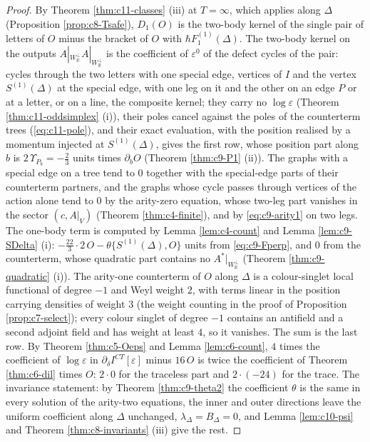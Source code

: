 \begin{proof}
By Theorem \ref{thm:c11-classes} (iii) at $T=\infty$, which applies along $\Delta$ (Proposition \ref{prop:c8-Tsafe}), $D_1(O)$ is the two-body kernel of the single pair of letters of $O$ minus the bracket of $O$ with $\hbar F_1^{(1)}(\Delta)$. The two-body kernel on the outputs $A|_{W_{\mathbb R}^\perp}A|_{W_{\mathbb R}^\perp}$ is the coefficient of $\varepsilon^0$ of the defect cycles of the pair: cycles through the two letters with one special edge, vertices of $I$ and the vertex $S^{(1)}(\Delta)$ at the special edge, with one leg on it and the other on an edge $P$ or at a letter, or on a line, the composite kernel; they carry no $\log\varepsilon$ (Theorem \ref{thm:c11-oddsimplex} (i)), their poles cancel against the poles of the counterterm trees (\eqref{eq:c11-pole}), and their exact evaluation, with the position realised by a momentum injected at $S^{(1)}(\Delta)$, gives the first row, whose position part along $b$ is $2\,\Upsilon_{P_b}=-\tfrac23$ units times $\partial_bO$ (Theorem \ref{thm:c9-P1} (ii)). The graphs with a special edge on a tree tend to $0$ together with the special-edge parts of their counterterm partners, and the graphs whose cycle passes through vertices of the action alone tend to $0$ by the arity-zero equation, whose two-leg part vanishes in the sector $(c,A|_V)$ (Theorem \ref{thm:c4-finite}), and by \eqref{eq:c9-arity1} on two legs. The one-body term is computed by Lemma \ref{lem:c4-count} and Lemma \ref{lem:c9-SDelta} (i): $-\tfrac{22}3\cdot2\,O-\theta\{S^{(1)}(\Delta),O\}$ units from \eqref{eq:c9-Fperp}, and $0$ from the counterterm, whose quadratic part contains no $A^*|_{W_{\mathbb R}^\perp}$ (Theorem \ref{thm:c9-quadratic} (i)). The arity-one counterterm of $O$ along $\Delta$ is a colour-singlet local functional of degree $-1$ and Weyl weight $2$, with terms linear in the position carrying densities of weight $3$ (the weight counting in the proof of Proposition \ref{prop:c7-select}); every colour singlet of degree $-1$ contains an antifield and a second adjoint field and has weight at least $4$, so it vanishes. The sum is the last row. By Theorem \ref{thm:c5-Oeps} and Lemma \ref{lem:c6-count}, $4$ times the coefficient of $\log\varepsilon$ in $\partial_\delta I^{CT}[\varepsilon]$ minus $16\,O$ is twice the coefficient of Theorem \ref{thm:c6-dil} times $O$: $2\cdot0$ for the traceless part and $2\cdot(-24)$ for the trace. The invariance statement: by Theorem \ref{thm:c9-theta2} the coefficient $\theta$ is the same in every solution of the arity-two equations, the inner and outer directions leave the uniform coefficient along $\Delta$ unchanged, $\lambda_\Delta=B_\Delta=0$, and Lemma \ref{lem:c10-psi} and Theorem \ref{thm:c8-invariants} (iii) give the rest.
\end{proof}


